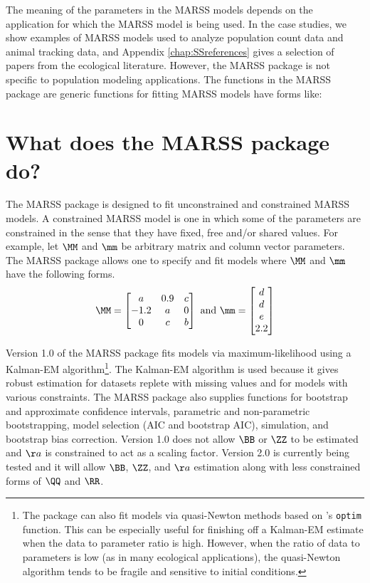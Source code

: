 The meaning of the parameters in the MARSS models depends on the application for which the MARSS model is being used.  In the case studies, we show examples of MARSS models used to analyze population count data and animal tracking data, and Appendix \ref{chap:SSreferences} gives a selection of papers from the ecological literature.  However, the MARSS package is not specific to population modeling applications.  The functions in the MARSS package are generic functions for fitting MARSS models have forms like: 

\section{What does the MARSS package do?}
The MARSS package is designed to fit unconstrained and constrained MARSS models.  A constrained MARSS model is one in which some of the parameters are constrained in the sense that they have fixed, free and/or shared values.  For example, let $\MM$ and $\mm$ be arbitrary matrix and column vector parameters.  The MARSS package allows one to specify and fit models where $\MM$ and $\mm$ have the following forms.
\begin{equation*}
\MM=
\begin{bmatrix}
a&0.9&c\\
-1.2&a&0\\
0&c&b
\end{bmatrix}
\text{ and }
\mm=
\begin{bmatrix}
d\\
d\\
e\\
2.2
\end{bmatrix}
\end{equation*}

Version 1.0 of the MARSS package fits models via maximum-likelihood using a Kalman-EM algorithm\footnote{The package can also fit models via quasi-Newton methods based on \R's \texttt{optim} function. This can be especially useful for finishing off a Kalman-EM estimate  when the data to parameter ratio is high.  However, when the ratio of data to parameters is low (as in many ecological applications), the quasi-Newton algorithm tends to be fragile and sensitive to initial conditions.}.  The Kalman-EM algorithm is used because it gives robust estimation for datasets replete with missing values and for models with various constraints.  The MARSS package also supplies functions for bootstrap and approximate confidence intervals, parametric and non-parametric bootstrapping, model selection (AIC and bootstrap AIC), simulation, and bootstrap bias correction.   Version 1.0 does not allow $\BB$ or $\ZZ$ to be estimated and $\aa$ is constrained to act as a scaling factor.  Version 2.0 is currently being tested and it will allow $\BB$, $\ZZ$, and $\aa$ estimation along with less constrained forms of $\QQ$ and $\RR$.

